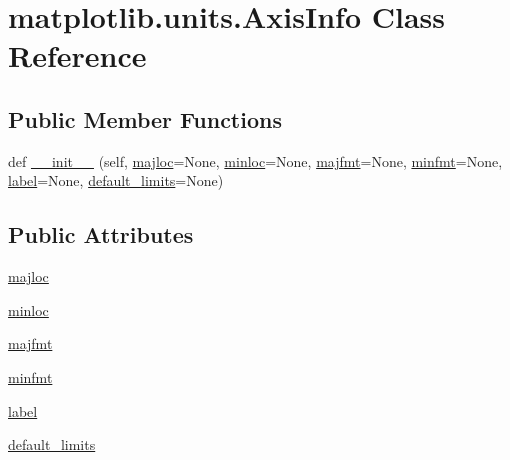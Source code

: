 \hypertarget{classmatplotlib_1_1units_1_1AxisInfo}{}\section{matplotlib.\+units.\+Axis\+Info Class Reference}
\label{classmatplotlib_1_1units_1_1AxisInfo}
\subsection*{Public Member Functions}
\begin{DoxyCompactItemize}
\item 
def \hyperlink{classmatplotlib_1_1units_1_1AxisInfo_a0180db004390ffd043ac931053bad0c1}{\+\_\+\+\_\+init\+\_\+\+\_\+} (self, \hyperlink{classmatplotlib_1_1units_1_1AxisInfo_a5101bc4644117d5c03dcec4f219cabee}{majloc}=None, \hyperlink{classmatplotlib_1_1units_1_1AxisInfo_a0e0bade112599bb5feb4e8ef8a30861a}{minloc}=None, \hyperlink{classmatplotlib_1_1units_1_1AxisInfo_a6da8d378a44bbc8f0ef8c5883961617b}{majfmt}=None, \hyperlink{classmatplotlib_1_1units_1_1AxisInfo_aeb222eb9f541a9a471070bc31f93c3f5}{minfmt}=None, \hyperlink{classmatplotlib_1_1units_1_1AxisInfo_ae66e2df4c53f2e31504adc76bb838b5f}{label}=None, \hyperlink{classmatplotlib_1_1units_1_1AxisInfo_a04da1c0de400c2b65fd3c98160401a14}{default\+\_\+limits}=None)
\end{DoxyCompactItemize}
\subsection*{Public Attributes}
\begin{DoxyCompactItemize}
\item 
\hyperlink{classmatplotlib_1_1units_1_1AxisInfo_a5101bc4644117d5c03dcec4f219cabee}{majloc}
\item 
\hyperlink{classmatplotlib_1_1units_1_1AxisInfo_a0e0bade112599bb5feb4e8ef8a30861a}{minloc}
\item 
\hyperlink{classmatplotlib_1_1units_1_1AxisInfo_a6da8d378a44bbc8f0ef8c5883961617b}{majfmt}
\item 
\hyperlink{classmatplotlib_1_1units_1_1AxisInfo_aeb222eb9f541a9a471070bc31f93c3f5}{minfmt}
\item 
\hyperlink{classmatplotlib_1_1units_1_1AxisInfo_ae66e2df4c53f2e31504adc76bb838b5f}{label}
\item 
\hyperlink{classmatplotlib_1_1units_1_1AxisInfo_a04da1c0de400c2b65fd3c98160401a14}{default\+\_\+limits}
\end{DoxyCompactItemize}


